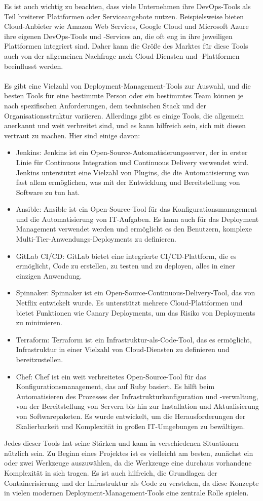 \documentclass[../vs-script-first-v01.tex]{subfiles}
\begin{document}
Es ist auch wichtig zu beachten, dass viele Unternehmen ihre DevOps-Tools als Teil breiterer Plattformen oder Serviceangebote nutzen. Beispielsweise bieten Cloud-Anbieter wie Amazon Web Services, Google Cloud und Microsoft Azure ihre eigenen DevOps-Tools und -Services an, die oft eng in ihre jeweiligen Plattformen integriert sind. Daher kann die Größe des Marktes für diese Tools auch von der allgemeinen Nachfrage nach Cloud-Diensten und -Plattformen beeinflusst werden.
\\\\
Es gibt eine Vielzahl von Deployment-Management-Tools zur Auswahl, und die besten Tools für eine bestimmte Person oder ein bestimmtes Team können je nach spezifischen Anforderungen, dem technischen Stack und der Organisationsstruktur variieren. Allerdings gibt es einige Tools, die allgemein anerkannt und weit verbreitet sind, und es kann hilfreich sein, sich mit diesen vertraut zu machen. Hier sind einige davon:
\begin{itemize} 
\item Jenkins: Jenkins ist ein Open-Source-Automatisierungsserver, der in erster Linie für Continuous Integration und Continuous Delivery verwendet wird. Jenkins unterstützt eine Vielzahl von Plugins, die die Automatisierung von fast allem ermöglichen, was mit der Entwicklung und Bereitstellung von Software zu tun hat.
\item Ansible: Ansible ist ein Open-Source-Tool für das Konfigurationsmanagement und die Automatisierung von IT-Aufgaben. Es kann auch für das Deployment Management verwendet werden und ermöglicht es den Benutzern, komplexe Multi-Tier-Anwendungs-Deployments zu definieren.
\item GitLab CI/CD: GitLab bietet eine integrierte CI/CD-Plattform, die es ermöglicht, Code zu erstellen, zu testen und zu deployen, alles in einer einzigen Anwendung.
\item Spinnaker: Spinnaker ist ein Open-Source-Continuous-Delivery-Tool, das von Netflix entwickelt wurde. Es unterstützt mehrere Cloud-Plattformen und bietet Funktionen wie Canary Deployments, um das Risiko von Deployments zu minimieren.
\item Terraform: Terraform ist ein Infrastruktur-als-Code-Tool, das es ermöglicht, Infrastruktur in einer Vielzahl von Cloud-Diensten zu definieren und bereitzustellen.
\item Chef: Chef ist ein weit verbreitetes Open-Source-Tool für das Konfigurationsmanagement, das auf Ruby basiert. Es hilft beim Automatisieren des Prozesses der Infrastrukturkonfiguration und -verwaltung, von der Bereitstellung von Servern bis hin zur Installation und Aktualisierung von Softwarepaketen. Es wurde entwickelt, um die Herausforderungen der Skalierbarkeit und Komplexität in großen IT-Umgebungen zu bewältigen.
\end{itemize} 
Jedes dieser Tools hat seine Stärken und kann in verschiedenen Situationen nützlich sein. Zu Beginn eines Projektes ist es vielleicht am besten, zunächst ein oder zwei Werkzeuge auszuwählen, da die Werkzeuge eine durchaus vorhandene Komplexität in sich tragen. Es ist auch hilfreich, die Grundlagen der Containerisierung und der Infrastruktur als Code zu verstehen, da diese Konzepte in vielen modernen Deployment-Management-Tools eine zentrale Rolle spielen.
\end{document}
